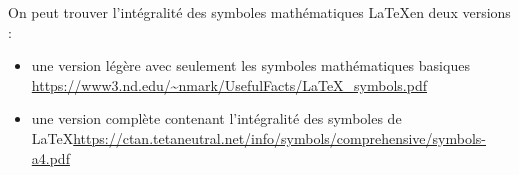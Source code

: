 \documentclass[../../../main.tex]{subfiles}
\begin{document}
On peut trouver l'intégralité des symboles mathématiques \LaTeX en deux versions :
\begin{itemize}
	\item une version légère avec seulement les symboles mathématiques basiques \url{https://www3.nd.edu/~nmark/UsefulFacts/LaTeX_symbols.pdf} 
	\item une version complète contenant l'intégralité des symboles de \LaTeX \url{https://ctan.tetaneutral.net/info/symbols/comprehensive/symbols-a4.pdf}
\end{itemize}
\end{document}
